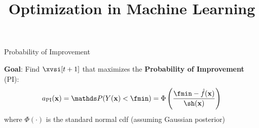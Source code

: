 \documentclass[11pt,compress,t,notes=noshow, xcolor=table]{beamer}
\title{Optimization in Machine Learning}
\begin{document}

\begin{frame}{Probability of Improvement}

\textbf{Goal}: Find $\xvsi[t+1]$ that maximizes the \textbf{Probability of Improvement} (PI):
$$
  a_{\text{PI}}(\xv) = \P(Y(\xv) < \fmin) = \Phi\left(\frac{\fmin - \fh(\xv)}{\sh(\xv)}\right)
$$
where $\Phi(\cdot)$ is the standard normal cdf (assuming Gaussian posterior) 



\end{frame}
\end{document}
